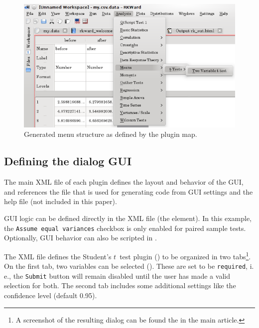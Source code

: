 \begin{figure}[t!]
 \centering
 \includegraphics{./figures/ttest-gui-example.png}
 \caption{Generated menu structure as defined by the plugin map.}
 \label{fig:ttest-gui-example}
\end{figure}


\subsection {Defining the dialog GUI}
\label{sec:defining_dialog_ui}
The main XML file of each plugin defines the layout and behavior of the GUI, and references the
 file that is used for generating  code from GUI settings and the help file (not included in this paper).

GUI logic can be defined directly in the XML file (the  element).
In this example, the \texttt{Assume equal variances} checkbox is only enabled for paired sample tests.
Optionally, GUI behavior can also be scripted in .

The XML file defines the Student's $t$~test plugin () to be organized in two tabs\footnote{
  A screenshot of the resulting dialog can be found the in the main article.
}.
On the first tab, two variables can be selected (). These are set to be \texttt{required}, i.\,e.,
the \texttt{Submit} button will remain disabled until the user has made a valid selection for both. The second tab includes some
additional settings like the confidence level (default 0.95).

